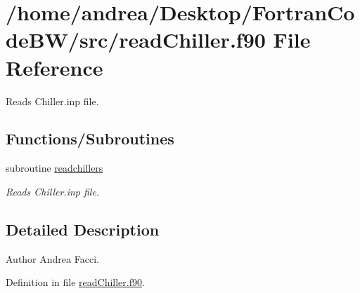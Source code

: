 \hypertarget{read_chiller_8f90}{\section{/home/andrea/\-Desktop/\-Fortran\-Code\-B\-W/src/read\-Chiller.f90 File Reference}
\label{read_chiller_8f90}
}


Reads Chiller.\-inp file.  


\subsection*{Functions/\-Subroutines}
\begin{DoxyCompactItemize}
\item 
subroutine \hyperlink{read_chiller_8f90_a3c06bf38f25f8177df77cbf0c1cfd834}{readchillers}
\begin{DoxyCompactList}\small\item\em Reads Chiller.\-inp file. \end{DoxyCompactList}\end{DoxyCompactItemize}


\subsection{Detailed Description}
\begin{DoxyAuthor}{Author}
Andrea Facci. 
\end{DoxyAuthor}


Definition in file \hyperlink{read_chiller_8f90_source}{read\-Chiller.\-f90}.



